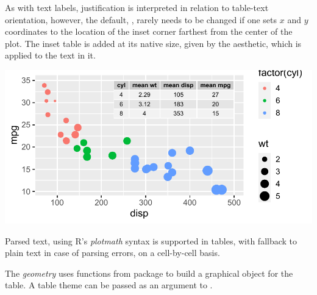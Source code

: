 \documentclass[krantz2]{krantz}\usepackage{knitr}
\begin{document}
As with text labels, justification is interpreted in relation to table-text orientation, however, the default, , rarely needs to be changed if one sets $x$ and $y$ coordinates to the location of the inset corner farthest from the center of the plot. The inset table is added at its native size, given by the  aesthetic, which is applied to the text in it.

\begin{knitrout}\footnotesize
{}\color{fgcolor}\begin{kframe}
\begin{alltt}
\hlstd{(} 
        \hlstd{=} \hlstd{(}     \hlstd{=}    \hlopt{+}
  \hlstd{()} \hlopt{+}
  \hlstd{()} \hlopt{+}
  \hlstd{(} 
              \hlstd{=} \hlstd{(}     
              \hlstd{=} \hlstd{,}  \hlstd{=} \hlstd{)}
\end{alltt}
\end{kframe}

{\centering \includegraphics[width=.7\textwidth]{figure/pos-table-plot-02-1} 

}


\end{knitrout}

Parsed text, using R's \emph{plotmath} syntax is supported in tables, with fallback to plain text in case of parsing errors, on a cell-by-cell basis.

\begin{explainbox}
The \emph{geometry}  uses functions from package  to build a graphical object for the table. A table theme can be passed as an argument to .
\end{explainbox}
\end{document}
